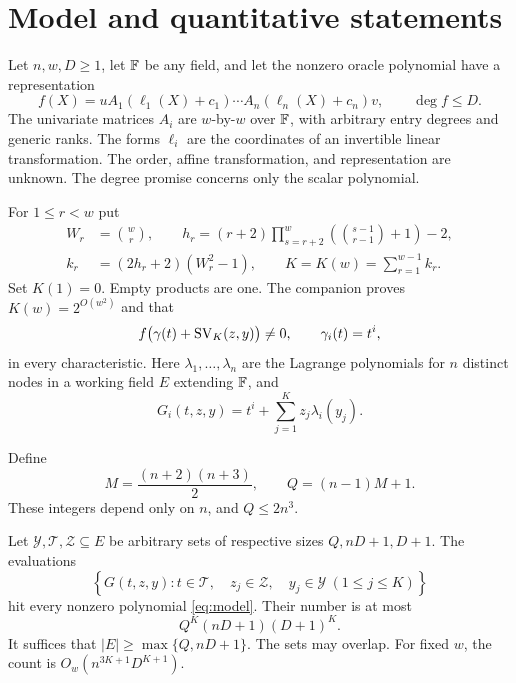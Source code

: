\section{Model and quantitative statements}

Let $n,w,D\ge1$, let $\mathbb F$ be any field, and let the nonzero oracle
polynomial have a representation
\begin{equation}\label{eq:model}
 f(X)=uA_1(\ell_1(X)+c_1)\cdots A_n(\ell_n(X)+c_n)v,
 \qquad \deg f\le D.
\end{equation}
The univariate matrices $A_i$ are $w$-by-$w$ over $\mathbb F$, with arbitrary
entry degrees and generic ranks. The forms $\ell_i$ are the coordinates
of an invertible linear transformation. The order, affine transformation,
and representation are unknown. The degree promise concerns only the
scalar polynomial.

For $1\le r<w$ put
\begin{align}
 W_r&=\binom wr,\qquad
 h_r=(r+2)\prod_{s=r+2}^w
                   \left(\binom{s-1}{r-1}+1\right)-2,\label{eq:h}\\
 k_r&=(2h_r+2)(W_r^2-1),\qquad
 K=K(w)=\sum_{r=1}^{w-1}k_r.\label{eq:K}
\end{align}
Set $K(1)=0$. Empty products are one. The companion proves
$K(w)=2^{O(w^2)}$ and that
\[
 f\bigl(\gamma(t)+\operatorname{SV}_K(z,y)\bigr)\ne0,
 \qquad \gamma_i(t)=t^i,
\]
in every characteristic. Here $\lambda_1,\ldots,\lambda_n$ are the
Lagrange polynomials for $n$ distinct nodes in a working field $E$
extending $\mathbb F$, and
\[
 G_i(t,z,y)=t^i+\sum_{j=1}^K z_j\lambda_i(y_j).
\]

Define
\begin{equation}\label{eq:Q}
 M=\frac{(n+2)(n+3)}2,\qquad Q=(n-1)M+1.
\end{equation}
These integers depend only on $n$, and $Q\le2n^3$.

\begin{theorem}\label{thm:grid}
Let $\mathcal Y,\mathcal T,\mathcal Z\subseteq E$ be arbitrary sets
of respective sizes $Q,nD+1,D+1$. The evaluations
\[
 \left\{G(t,z,y):
 t\in\mathcal T,\quad z_j\in\mathcal Z,\quad
 y_j\in\mathcal Y\ (1\le j\le K)\right\}
\]
hit every nonzero polynomial \eqref{eq:model}. Their number is at most
\begin{equation}\label{eq:count}
 Q^K(nD+1)(D+1)^K.
\end{equation}
It suffices that $|E|\ge\max\{Q,nD+1\}$. The sets may overlap.
For fixed $w$, the count is $O_w(n^{3K+1}D^{K+1})$.
\end{theorem}


